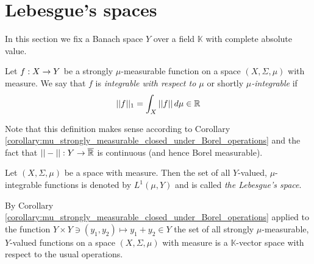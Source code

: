 \section{Lebesgue's spaces}\label{section:lebesgue_spaces}
\noindent
In this section we fix a Banach space $Y$ over a field $\mathbb{K}$ with complete absolute value.

\begin{definition}
Let $f:X\rightarrow Y$ be a strongly $\mu$-measurable function on a space $(X,\Sigma,\mu)$ with measure. We say that $f$ is \textit{integrable with respect to $\mu$} or shortly \textit{$\mu$-integrable} if
$$||f||_1 = \int_X||f||\,d\mu \in {\mathbb R}$$
\end{definition}
\noindent
Note that this definition makes sense according to Corollary \ref{corollary:mu_strongly_measurable_closed_under_Borel_operations} and the fact that $||-||:Y\rightarrow \overline{{\mathbb R}}$ is continuous (and hence Borel measurable).

\begin{definition}
Let $(X,\Sigma,\mu)$ be a space with measure. Then the set of all $Y$-valued, $\mu$-integrable functions is denoted by $L^1(\mu,Y)$ and is called \textit{the Lebesgue's space}.
\end{definition}
\noindent
By Corollary \ref{corollary:mu_strongly_measurable_closed_under_Borel_operations} applied to the function $Y\times Y\ni (y_1,y_2) \mapsto y_1 + y_2 \in Y$ the set of all strongly $\mu$-measurable, $Y$-valued functions on a space $(X,\Sigma,\mu)$ with measure is a $\mathbb{K}$-vector space with respect to the usual operations.

